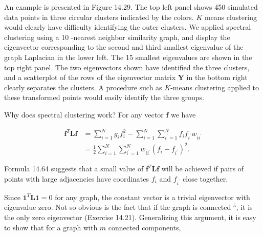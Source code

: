 \documentclass[10pt]{article}
\begin{document}
An example is presented in Figure 14.29. The top left panel shows 450 simulated data points in three circular clusters indicated by the colors. $K$ means clustering would clearly have difficulty identifying the outer clusters. We applied spectral clustering using a 10 -nearest neighbor similarity graph, and display the eigenvector corresponding to the second and third smallest eigenvalue of the graph Laplacian in the lower left. The 15 smallest eigenvalues are shown in the top right panel. The two eigenvectors shown have identified the three clusters, and a scatterplot of the rows of the eigenvector matrix $\mathbf{Y}$ in the bottom right clearly separates the clusters. A procedure such as $K$-means clustering applied to these transformed points would easily identify the three groups.

Why does spectral clustering work? For any vector $\mathbf{f}$ we have


\begin{align*}
\mathbf{f}^{T} \mathbf{L} \mathbf{f} & =\sum_{i=1}^{N} g_{i} f_{i}^{2}-\sum_{i=1}^{N} \sum_{i^{\prime}=1}^{N} f_{i} f_{i^{\prime}} w_{i i^{\prime}} \\
& =\frac{1}{2} \sum_{i=1}^{N} \sum_{i^{\prime}=1}^{N} w_{i i^{\prime}}\left(f_{i}-f_{i^{\prime}}\right)^{2} . \tag{14.64}
\end{align*}


Formula 14.64 suggests that a small value of $\mathbf{f}^{T} \mathbf{L} \mathbf{f}$ will be achieved if pairs of points with large adjacencies have coordinates $f_{i}$ and $f_{i^{\prime}}$ close together.

Since $\mathbf{1}^{T} \mathbf{L} \mathbf{1}=0$ for any graph, the constant vector is a trivial eigenvector with eigenvalue zero. Not so obvious is the fact that if the graph is connected ${ }^{5}$, it is the only zero eigenvector (Exercise 14.21). Generalizing this argument, it is easy to show that for a graph with $m$ connected components,
\end{document}
